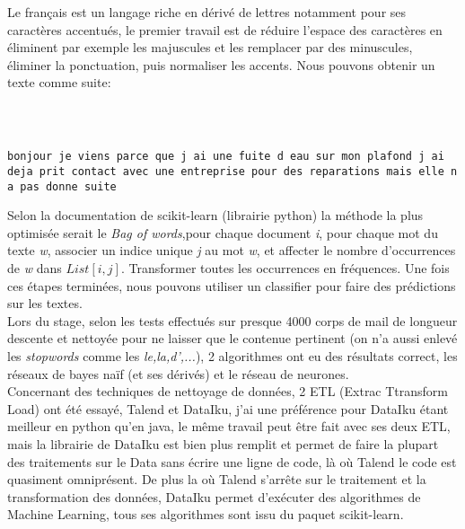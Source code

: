 Le français est un langage riche en dérivé de lettres notamment pour ses caractères accentués, le premier travail est de réduire l'espace des caractères en éliminent par exemple les majuscules et les remplacer par des minuscules, éliminer la ponctuation, puis normaliser les accents. Nous pouvons obtenir un texte comme suite:



\sepline\\

\begin{lstlisting}

bonjour je viens parce que j ai une fuite d eau sur mon plafond j ai deja prit contact avec une entreprise pour des reparations mais elle n a pas donne suite

\end{lstlisting}

Selon la documentation de scikit-learn (librairie python) la méthode la plus optimisée serait le \textit{Bag of words},pour chaque document \textit{i}, pour chaque mot du texte \textit{w}, associer un indice unique \textit{j} au mot \textit{w}, et affecter le nombre d'occurrences de \textit{w} dans $List[i,j]$. Transformer toutes les occurrences en fréquences. Une fois ces étapes terminées, nous pouvons utiliser un classifier pour faire des prédictions sur les textes.\\
Lors du stage, selon les tests effectués sur presque 4000 corps de mail de longueur descente et nettoyée pour ne laisser que le contenue pertinent (on n'a aussi enlevé les \textit{stopwords} comme les \textit{le,la,d',...}), 2 algorithmes ont eu des résultats correct, les réseaux  de bayes naïf (et ses dérivés) et le réseau de neurones.\\
\linebreak
Concernant des techniques de nettoyage de données, 2 ETL (Extrac Ttransform Load) ont été essayé, Talend et DataIku, j'ai une préférence pour DataIku étant meilleur en python qu'en java, le même travail peut être fait avec ses deux ETL, mais la librairie de DataIku est bien plus remplit et permet de faire la plupart des traitements sur le Data sans écrire une ligne de code, là où Talend le code est quasiment omniprésent. De plus la où Talend s'arrête sur le traitement et la transformation des données, DataIku permet d'exécuter des algorithmes de Machine Learning, tous ses algorithmes sont issu du paquet scikit-learn.
\pagebreak

